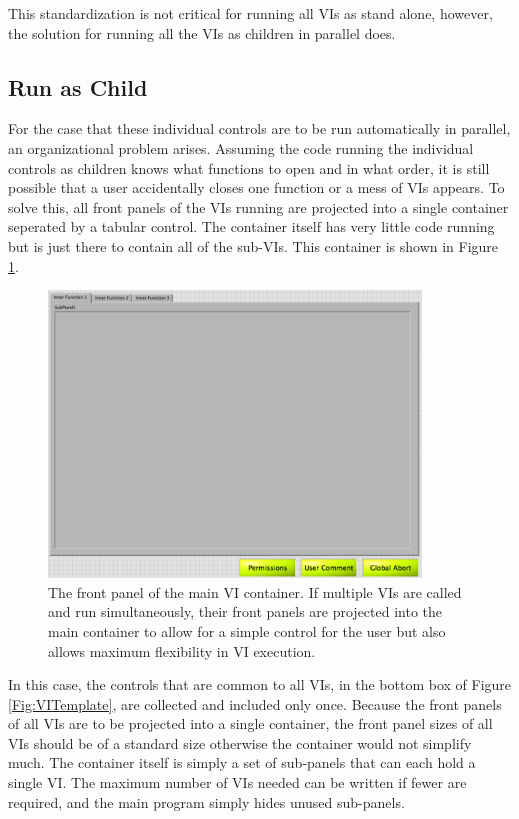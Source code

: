 This standardization is not critical for running all VIs as stand alone, however, the solution for running all the VIs as children in parallel does. 

\subsection{Run as Child}

For the case that these individual controls are to be run automatically in parallel, an organizational problem arises. Assuming the code running the individual controls as children knows what functions to open and in what order, it is still possible that a user accidentally closes one function or a mess of VIs appears. To solve this, all front panels of the VIs running are projected into a single container seperated by a tabular control. The container itself has very little code running but is just there to contain all of the sub-VIs. This container is shown in Figure \ref{Fig:VIContainer}.

\begin{figure}[!h]\centering
\includegraphics[height=3in]{Figures/MainVIContainer}
\caption{The front panel of the main VI container. If multiple VIs are called and run simultaneously, their front panels are projected into the main container to allow for a simple control for the user but also allows maximum flexibility in VI execution.}\label{Fig:VIContainer}
\end{figure}

In this case, the controls that are common to all VIs, in the bottom box of Figure \ref{Fig:VITemplate}, are collected and included only once. Because the front panels of all VIs are to be projected into a single container, the front panel sizes of all VIs should be of a standard size otherwise the container would not simplify much. The container itself  is simply a set of sub-panels that can each hold a single VI. The maximum number of VIs needed can be written if fewer are required, and the main program simply hides unused sub-panels. 

